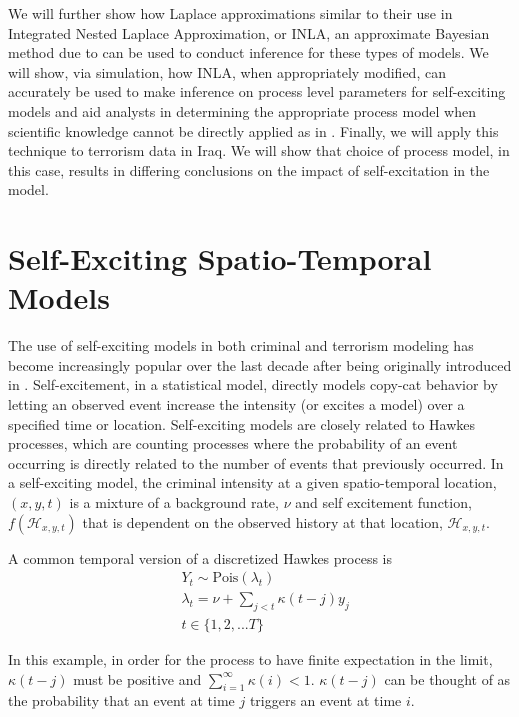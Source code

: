 \documentclass[11pt]{isuthesis}
\begin{document}
We will further show how Laplace approximations similar to their use in Integrated Nested Laplace Approximation, or INLA, an approximate Bayesian method due to \cite{rue2009approximate} can be used to conduct inference for these types of models. We will show, via simulation, how INLA, when appropriately modified, can accurately be used to make inference on process level parameters for self-exciting models and aid analysts in determining the appropriate process model when scientific knowledge cannot be directly applied as in \cite{cressie2015statistics}.  Finally, we will apply this technique to terrorism data in Iraq.  We will show that choice of process model, in this case, results in differing conclusions on the impact of self-excitation in the model.  


\section{Self-Exciting Spatio-Temporal Models}
The use of self-exciting models in both criminal and terrorism modeling has become increasingly popular over the last decade after being originally introduced in \cite{short2008statistical}.  Self-excitement, in a statistical model, directly models copy-cat behavior by letting an observed event increase the intensity (or excites a model) over a specified time or location. Self-exciting models are closely related to Hawkes processes, which are counting processes where the probability of an event occurring is directly related to the number of events that previously occurred. In a self-exciting model, the criminal intensity at a given spatio-temporal location, $(x,y,t)$ is a mixture of a background rate, $\nu$ and self excitement function, $f(\mathcal{H}_{x,y,t})$ that is dependent on the observed history at that location, $\mathcal{H}_{x,y,t}$.  

A common temporal version of a discretized Hawkes process is
\begin{align}
& Y_t\sim \mbox{Pois}(\lambda_t) \\
& \lambda_t = \nu + \sum_{j < t} \kappa (t-j) y_j \nonumber\\
& t \in \{1,2,...T\}
\end{align}

In this example, in order for the process to have finite expectation in the limit, $\kappa(t-j)$ must be positive and $\sum_{i=1}^{\infty} \kappa (i) <1$.  $\kappa (t-j)$ can be thought of as the probability that an event at time $j$ triggers an event at time $i$.
\end{document}
